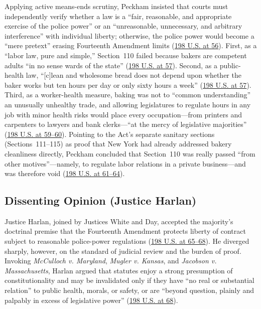 \documentclass[12pt]{article}
\begin{document}
Applying active means-ends scrutiny, Peckham insisted that courts must independently verify whether a law is a ``fair, reasonable, and appropriate exercise of the police power'' or an ``unreasonable, unnecessary, and arbitrary interference'' with individual liberty; otherwise, the police power would become a ``mere pretext'' erasing Fourteenth Amendment limits (\href{https://caselaw.findlaw.com/court/us-supreme-court/198/45.html}{198 U.S. at 56}). First, as a ``labor law, pure and simple,'' Section~110 failed because bakers are competent adults ``in no sense wards of the state'' (\href{https://caselaw.findlaw.com/court/us-supreme-court/198/45.html}{198 U.S. at 57}). Second, as a public-health law, ``[c]lean and wholesome bread does not depend upon whether the baker works but ten hours per day or only sixty hours a week'' (\href{https://caselaw.findlaw.com/court/us-supreme-court/198/45.html}{198 U.S. at 57}). Third, as a worker-health measure, baking was not to ``common understanding'' an unusually unhealthy trade, and allowing legislatures to regulate hours in any job with minor health risks would place every occupation---from printers and carpenters to lawyers and bank clerks---``at the mercy of legislative majorities'' (\href{https://caselaw.findlaw.com/court/us-supreme-court/198/45.html}{198 U.S. at 59--60}). Pointing to the Act's separate sanitary sections (Sections~111--115) as proof that New York had already addressed bakery cleanliness directly, Peckham concluded that Section~110 was really passed ``from other motives''---namely, to regulate labor relations in a private business---and was therefore void (\href{https://caselaw.findlaw.com/court/us-supreme-court/198/45.html}{198 U.S. at 61--64}).

\subsection{Dissenting Opinion (Justice Harlan)}

Justice Harlan, joined by Justices White and Day, accepted the majority's doctrinal premise that the Fourteenth Amendment protects liberty of contract subject to reasonable police-power regulations (\href{https://caselaw.findlaw.com/court/us-supreme-court/198/45.html}{198 U.S. at 65--68}). He diverged sharply, however, on the standard of judicial review and the burden of proof. Invoking \textit{McCulloch v. Maryland}, \textit{Mugler v. Kansas}, and \textit{Jacobson v. Massachusetts}, Harlan argued that statutes enjoy a strong presumption of constitutionality and may be invalidated only if they have ``no real or substantial relation'' to public health, morals, or safety, or are ``beyond question, plainly and palpably in excess of legislative power'' (\href{https://caselaw.findlaw.com/court/us-supreme-court/198/45.html}{198 U.S. at 68}).
\end{document}
